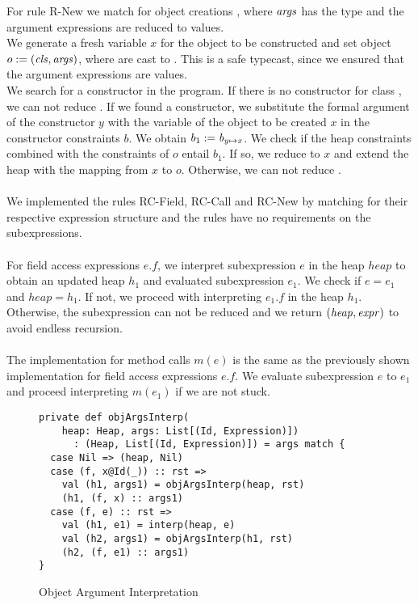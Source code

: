 %
For rule R-New we match for object creations ,
where $\mathit{args}$ has the type 
and the argument expressions are reduced to values.\\
We generate a fresh variable $x$ for the object to be constructed
and set object $o := (\mathit{cls}, \mathit{args})$, %
where  are cast to .
This is a safe typecast, since we ensured
that the argument expressions are values.\\
We search for a constructor  in the program.
If there is no constructor for class ,
we can not reduce .
If we found a constructor,
we substitute the formal argument of the constructor $y$
with the variable of the object to be created $x$
in the constructor constraints $b$.
We obtain $b_1 := \mathit{b}_{\mathit{y} \mapsto \mathit{x}}$.
We check if the heap constraints combined
with the constraints of $o$ entail $b_1$.
If so, we reduce  to $x$
and extend the heap with the mapping from $x$ to $o$.
Otherwise, we can not reduce .\\
\\
We implemented the rules RC-Field, RC-Call and RC-New
by matching for their respective expression structure
and the rules have no requirements on the subexpressions.\\
\\
For field access expressions $e.f$,
we interpret subexpression $e$ in the heap $heap$
to obtain an updated heap $h_1$ and evaluated subexpression $e_1$.
We check if $e = e_1$ and $heap = h_1$.
If not, we proceed with interpreting $e_1.f$ in the heap $h_1$.
Otherwise, the subexpression can not be reduced
and we return $(\mathit{heap}, \mathit{expr})$ to avoid endless recursion.\\
\\
The implementation for method calls $m(e)$ is the same
as the previously shown implementation for field access expressions $e.f$.
We evaluate subexpression $e$ to $e_1$ and proceed
interpreting $m(e_1)$ if we are not stuck.
%
\begin{figure}[h]
\begin{lstlisting}
private def objArgsInterp(
    heap: Heap, args: List[(Id, Expression)])
      : (Heap, List[(Id, Expression)]) = args match {
  case Nil => (heap, Nil)
  case (f, x@Id(_)) :: rst =>
    val (h1, args1) = objArgsInterp(heap, rst)
    (h1, (f, x) :: args1)
  case (f, e) :: rst =>
    val (h1, e1) = interp(heap, e)
    val (h2, args1) = objArgsInterp(h1, rst)
    (h2, (f, e1) :: args1)
}
\end{lstlisting}
\caption{Object Argument Interpretation}
\label{fig:scala-objArgsInterp}
\end{figure}\\
